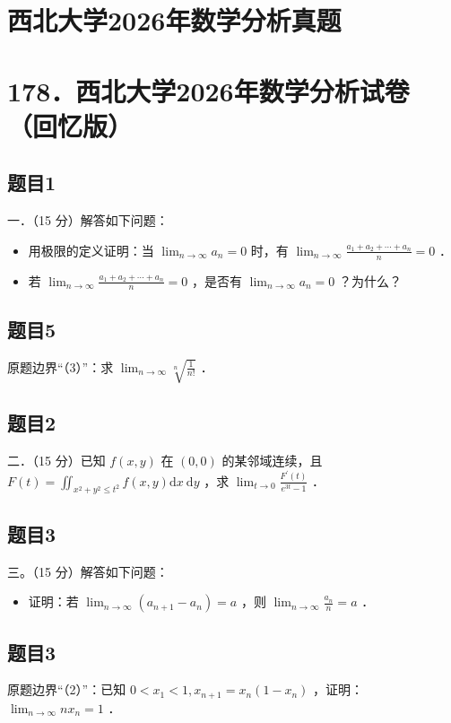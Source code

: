 \documentclass{article}
\begin{document}
\section*{西北大学2026年数学分析真题}
\section*{178．西北大学2026年数学分析试卷（回忆版）}

\subsection{题目1}
一．（15 分）解答如下问题：

\begin{itemize}
  \item[（1）] 用极限的定义证明：当 \(\lim _{n \rightarrow \infty} a_{n}=0\) 时，有 \(\lim _{n \rightarrow \infty} \frac{a_{1}+a_{2}+\cdots+a_{n}}{n}=0\) ．
  \item[（2）] 若 \(\lim _{n \rightarrow \infty} \frac{a_{1}+a_{2}+\cdots+a_{n}}{n}=0\) ，是否有 \(\lim _{n \rightarrow \infty} a_{n}=0\) ？为什么？
\end{itemize}

\subsection{题目5}
原题边界“（3）”：求 \(\lim _{n \rightarrow \infty} \sqrt[n]{\frac{1}{n!}}\) ．

\subsection{题目2}
二．（15 分）已知 \(f(x, y)\) 在 \((0,0)\) 的某邻域连续，且 \(F(t)=\iint_{x^{2}+y^{2} \leq t^{2}} f(x, y) \mathrm{d} x \mathrm{~d} y\) ，求 \(\lim _{t \rightarrow 0} \frac{F^{\prime}(t)}{e^{3 t}-1}\) ．

\subsection{题目3}
三。（15 分）解答如下问题：

\begin{itemize}
  \item[（1）] 证明：若 \(\lim _{n \rightarrow \infty}\left(a_{n+1}-a_{n}\right)=a\) ，则 \(\lim _{n \rightarrow \infty} \frac{a_{n}}{n}=a\) ．
\end{itemize}

\subsection{题目3}
原题边界“（2）”：已知 \(0<x_{1}<1, x_{n+1}=x_{n}\left(1-x_{n}\right)\) ，证明： \(\lim _{n \rightarrow \infty} n x_{n}=1\) ．
\end{document}
